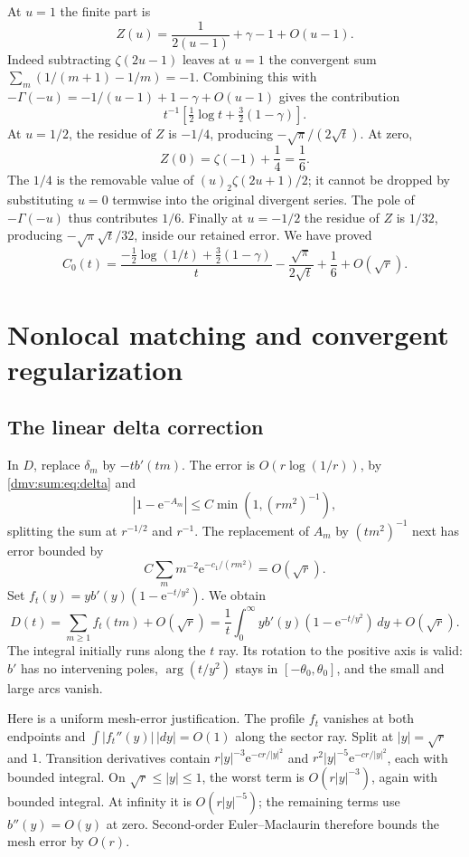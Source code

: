 \documentclass[11pt,letterpaper]{article}
\numberwithin{equation}{section}
\theoremstyle{definition}\newtheorem{definition}[theorem]{Definition}
\theoremstyle{remark}\newtheorem{remark}[theorem]{Remark}
\newcommand{\ee}{\mathrm e}
\begin{document}
At $u=1$ the finite part is
\[
 Z(u)=\frac1{2(u-1)}+\gamma-1+O(u-1).
\]
Indeed subtracting $\zeta(2u-1)$ leaves at $u=1$ the convergent sum $\sum_m(1/(m+1)-1/m)=-1$. Combining this with
$-\Gamma(-u)=-1/(u-1)+1-\gamma+O(u-1)$ gives the contribution
\[
 t^{-1}\left[\tfrac12\log t+\tfrac32(1-\gamma)\right].
\]
At $u=1/2$, the residue of $Z$ is $-1/4$, producing $-\sqrt\pi/(2\sqrt t)$. At zero,
\[
 Z(0)=\zeta(-1)+\frac14=\frac16.
\]
The $1/4$ is the removable value of $(u)_2\zeta(2u+1)/2$; it cannot be dropped by substituting $u=0$ termwise into the original divergent series. The pole of $-\Gamma(-u)$ thus contributes $1/6$. Finally at $u=-1/2$ the residue of $Z$ is $1/32$, producing $-\sqrt\pi\sqrt t/32$, inside our retained error. We have proved
\begin{equation}\label{dmv:sum:eq:C0}
 C_0(t)=\frac{-\tfrac12\log(1/t)+\tfrac32(1-\gamma)}{t}
            -\frac{\sqrt\pi}{2\sqrt t}+\frac16+O(\sqrt r).
\end{equation}

\section{Nonlocal matching and convergent regularization}\label{dmv:sum:sec:nonlocal}
\subsection{The linear delta correction}
In $D$, replace $\delta_m$ by $-tb'(tm)$. The error is $O(r\log(1/r))$, by \eqref{dmv:sum:eq:delta} and
\[
 |1-\ee^{-A_m}|\le C\min(1,(rm^2)^{-1}),
\]
splitting the sum at $r^{-1/2}$ and $r^{-1}$. The replacement of $A_m$ by $(tm^2)^{-1}$ next has error bounded by
\[
 C\sum_m m^{-2}\ee^{-c_1/(rm^2)}=O(\sqrt r).
\]
Set $f_t(y)=yb'(y)(1-\ee^{-t/y^2})$. We obtain
\begin{equation}\label{dmv:sum:eq:Dint}
 D(t)=\sum_{m\ge1}f_t(tm)+O(\sqrt r)
     =\frac1t\int_0^\infty yb'(y)(1-\ee^{-t/y^2})\,dy+O(\sqrt r).
\end{equation}
The integral initially runs along the $t$ ray. Its rotation to the positive axis is valid: $b'$ has no intervening poles, $\arg(t/y^2)$ stays in $[-\theta_0,\theta_0]$, and the small and large arcs vanish.

Here is a uniform mesh-error justification. The profile $f_t$ vanishes at both endpoints and $\int|f_t''(y)|\,|dy|=O(1)$ along the sector ray. Split at $|y|=\sqrt r$ and $1$. Transition derivatives contain $r|y|^{-3}\ee^{-cr/|y|^2}$ and $r^2|y|^{-5}\ee^{-cr/|y|^2}$, each with bounded integral. On $\sqrt r\le|y|\le1$, the worst term is $O(r|y|^{-3})$, again with bounded integral. At infinity it is $O(r|y|^{-5})$; the remaining terms use $b''(y)=O(y)$ at zero. Second-order Euler--Maclaurin therefore bounds the mesh error by $O(r)$.
\end{document}
